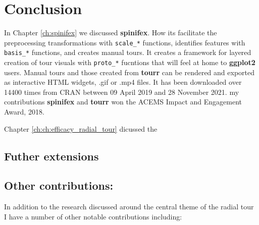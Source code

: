 \documentclass{template/monashthesis}
\begin{document}
\begin{Shaded}
\begin{Highlighting}[]
\SpecialCharTok{::}\SpecialCharTok{$}\NormalTok{(}
   \NormalTok{)}
\end{Highlighting}
\end{Shaded}

\hypertarget{ch:conclusion}{%
\chapter{Conclusion}\label{ch:conclusion}}

In Chapter \ref{ch:spinifex} we discussed \textbf{spinifex}. How its facilitate the preprocessing transformations with \texttt{scale\_*} functions, identifies features with \texttt{basis\_*} functions, and creates manual tours. It creates a framework for layered creation of tour visuals with \texttt{proto\_*} fucntions that will feel at home to \textbf{ggplot2} users. Manual tours and those created from \textbf{tourr} can be rendered and exported as interactive HTML widgets, .gif or .mp4 files. It has been downloaded over 14400 times from CRAN between 09 April 2019 and 28 November 2021. my contributions \textbf{spinifex} and \textbf{tourr} won the ACEMS Impact and Engagement Award, 2018.

Chapter \ref{ch:ch:efficacy_radial_tour} dicussed the

\hypertarget{futher-extensions}{%
\section{Futher extensions}\label{futher-extensions}}

\hypertarget{other-contributions}{%
\section{Other contributions:}\label{other-contributions}}

In addition to the research discussed around the central theme of the radial tour I have a number of other notable contributions including:
\end{document}
